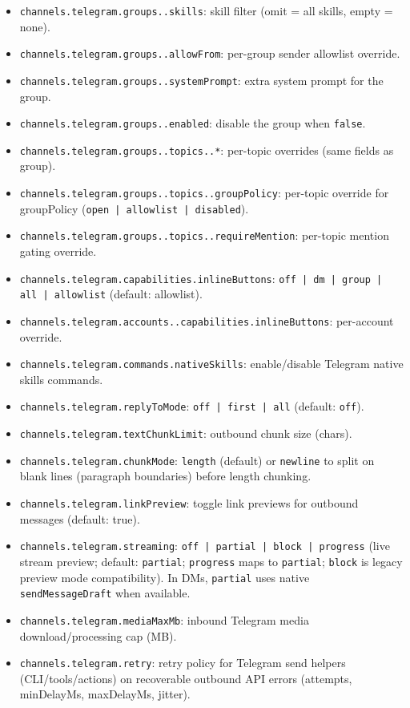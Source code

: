 \begin{itemize}
  \item \texttt{channels.telegram.groups..skills}: skill filter (omit = all skills, empty = none).
  \item \texttt{channels.telegram.groups..allowFrom}: per-group sender allowlist override.
  \item \texttt{channels.telegram.groups..systemPrompt}: extra system prompt for the group.
  \item \texttt{channels.telegram.groups..enabled}: disable the group when \texttt{false}.
  \item \texttt{channels.telegram.groups..topics..*}: per-topic overrides (same fields as group).
  \item \texttt{channels.telegram.groups..topics..groupPolicy}: per-topic override for groupPolicy (\texttt{open | allowlist | disabled}).
  \item \texttt{channels.telegram.groups..topics..requireMention}: per-topic mention gating override.
  \item \texttt{channels.telegram.capabilities.inlineButtons}: \texttt{off | dm | group | all | allowlist} (default: allowlist).
  \item \texttt{channels.telegram.accounts..capabilities.inlineButtons}: per-account override.
  \item \texttt{channels.telegram.commands.nativeSkills}: enable/disable Telegram native skills commands.
  \item \texttt{channels.telegram.replyToMode}: \texttt{off | first | all} (default: \texttt{off}).
  \item \texttt{channels.telegram.textChunkLimit}: outbound chunk size (chars).
  \item \texttt{channels.telegram.chunkMode}: \texttt{length} (default) or \texttt{newline} to split on blank lines (paragraph boundaries) before length chunking.
  \item \texttt{channels.telegram.linkPreview}: toggle link previews for outbound messages (default: true).
  \item \texttt{channels.telegram.streaming}: \texttt{off | partial | block | progress} (live stream preview; default: \texttt{partial}; \texttt{progress} maps to \texttt{partial}; \texttt{block} is legacy preview mode compatibility). In DMs, \texttt{partial} uses native \texttt{sendMessageDraft} when available.
  \item \texttt{channels.telegram.mediaMaxMb}: inbound Telegram media download/processing cap (MB).
  \item \texttt{channels.telegram.retry}: retry policy for Telegram send helpers (CLI/tools/actions) on recoverable outbound API errors (attempts, minDelayMs, maxDelayMs, jitter).

\end{itemize}
